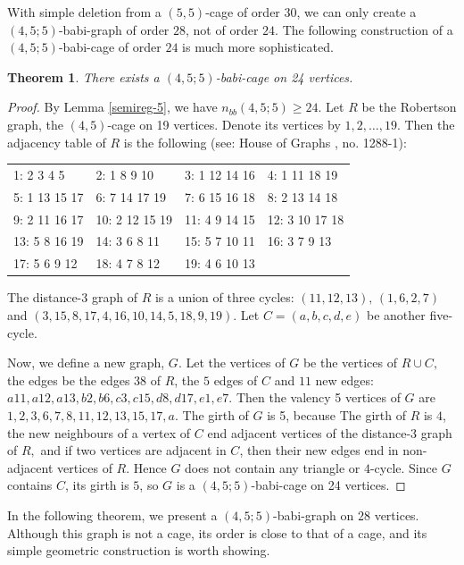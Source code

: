\documentclass[a4paper,11pt]{article}
\newtheorem{theorem}{Theorem}[section]
\begin{document}
With simple deletion from a $(5,5)$-cage of order $30$, we can only create a $(4,5;5)$-babi-graph of order $28$, not of order $24.$ The following construction of a $(4,5;5)$-babi-cage of order $24$ is much more sophisticated.


\begin{theorem}
There exists a $(4,5;5)$-babi-cage on 24 vertices.
\end{theorem}

\begin{proof}
By Lemma \ref{semireg-5}, we have $n_{bb}(4,5;5)\geq 24.$
Let $R$ be the Robertson graph, the $(4,5)$-cage on 19 vertices. Denote its vertices by $1,2,\dots ,19.$
Then the adjacency table of $R$ is the following (see: House of Graphs \cite{HoG}, no. 1288-1):

\medskip
\begin{tabular}{|l|l|l|l|}
\hline
1: 2 3 4 5
&
2: 1 8 9 10
&
3: 1 12 14 16
&
4: 1 11 18 19
\\
5: 1 13 15 17
&
6: 7 14 17 19
&
7: 6 15 16 18
&
8: 2 13 14 18
\\
9: 2 11 16 17
&
10: 2 12 15 19
&
11: 4 9 14 15
&
12: 3 10 17 18
\\
13: 5 8 16 19
&
14: 3 6 8 11
&
15: 5 7 10 11
&
16: 3 7 9 13
\\
17: 5 6 9 12
&
18: 4 7 8 12
&
19: 4 6 10 13
&
\\
\hline
\end{tabular}

\medskip
The distance-3 graph of $R$ is a union of three cycles: $(11,12,13), \, (1,6,2,7)$ and
$(3,15,8,17,4,16,10,14,5,18,9,19).$ Let $C=(a,b,c,d,e)$ be another five-cycle. 

Now, we define a new graph, $G$.
Let the vertices of $G$ be the vertices of $R\cup C,$ the edges be the edges $38$ of $R$, the
$5$ edges of $C$ and $11$ new edges: 
$a11, a12, a13, b2, b6, c3, c15, d8, d17, e1, e7.$
Then the valency 5 vertices of $G$ are $1,2,3,6,7,8,11,12,13,15,17,a.$ The girth of $G$ is 5, because
The girth of $R$ is $4$, the new neighbours 
of a vertex of $C$ end adjacent vertices of the distance-3 graph of $R,$ and if two 
vertices are adjacent in $C$, then their new edges end in non-adjacent vertices of $R$. Hence $G$ does not contain any triangle or $4$-cycle. Since $G$ contains $C$, its girth is $5$, so $G$ is a
$(4,5;5)$-babi-cage on 24 vertices.  
\end{proof}

In the following theorem, we present a $(4,5;5)$-babi-graph on $28$ vertices.
Although this graph is not a cage, its order is close to that of a cage, and its simple geometric construction is worth showing.
\end{document}
